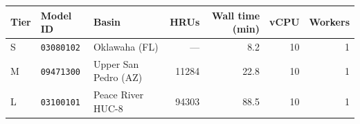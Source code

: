 \begin{tabular}{@{}lllrrrr@{}}
\toprule
Tier & Model ID & Basin & HRUs & Wall time (min) & vCPU & Workers \\
\midrule
S & \texttt{03080102} & Oklawaha (FL) & {---} & 8.2 & 10 & 1 \\
M & \texttt{09471300} & Upper San Pedro (AZ) & 11284 & 22.8 & 10 & 1 \\
L & \texttt{03100101} & Peace River HUC-8 & 94303 & 88.5 & 10 & 1 \\
\bottomrule
\end{tabular}
